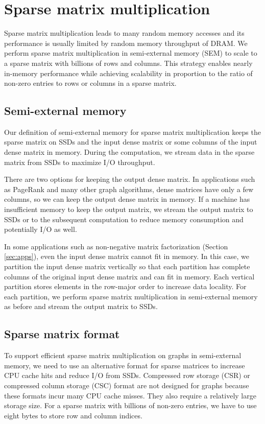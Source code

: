 \section{Sparse matrix multiplication} \label{sec:spmm}
Sparse matrix multiplication leads to many random memory
accesses and its performance is usually limited by random memory throughput
of DRAM. We perform sparse matrix multiplication in semi-external memory (SEM)
to scale to a sparse matrix with billions of rows and columns. This strategy enables
nearly in-memory performance while achieving scalability in proportion
to the ratio of non-zero entries to rows or columns in a sparse matrix.

\subsection{Semi-external memory}
Our definition of semi-external memory for sparse matrix multiplication
keeps the sparse matrix on SSDs and the input dense matrix or some columns
of the input dense matrix in memory. During the computation, we stream
data in the sparse matrix from SSDs to maximize I/O throughput.

There are two options for keeping the output dense matrix. In applications
such as PageRank and many other graph
algorithms, dense matrices have only a few columns, so we can keep the output
dense matrix in memory. If a machine has insufficient
memory to keep the output matrix, we stream the output matrix
to SSDs or to the subsequent computation to reduce memory consumption and
potentially I/O as well.

In some applications such as non-negative matrix factorization (Section
\ref{sec:apps}), even the input dense matrix cannot fit in memory. In this case,
we partition the input dense matrix vertically so that each partition has
complete columns of the original input dense matrix and can fit in memory.
Each vertical partition stores elements in the row-major order to increase
data locality. For each partition, we perform sparse matrix multiplication
in semi-external memory as before and stream the output matrix to SSDs.

\subsection{Sparse matrix format}
To support efficient sparse matrix multiplication on graphs in semi-external
memory, we need to use an alternative format for sparse matrices to increase
CPU cache hits and reduce I/O from SSDs. Compressed row
storage (CSR) or compressed column storage (CSC) format are not designed for
graphs because these formats incur many CPU cache misses. They also require
a relatively large storage size. For a sparse matrix with billions of non-zero
entries, we have to use eight bytes to store row and column indices.

